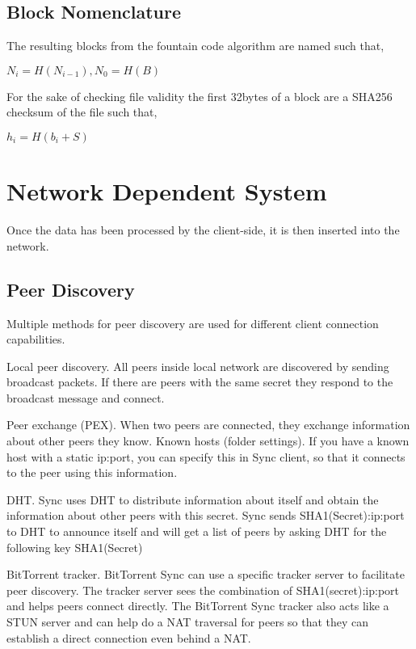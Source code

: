 \documentclass[journal]{IEEEtran}
\begin{document}
\subsection{Block Nomenclature}
The resulting blocks from the fountain code algorithm are named such that,

\begin{center}
$N_i = H(N_{i-1}), N_0 = H(B)$\\
\end{center}

For the sake of checking file validity the first 32bytes of a block are a SHA256 checksum of the file such that,

\begin{center}
$h_i = H(b_i + S)$\\
\end{center}

\section{Network Dependent System}
Once the data has been processed by the client-side, it is then inserted into the network.

\subsection{Peer Discovery}
Multiple methods for peer discovery are used for different client connection capabilities. 

Local peer discovery. All peers inside local network are discovered by sending broadcast packets. If there are peers with the same secret they respond to the broadcast message and connect.

Peer exchange (PEX). When two peers are connected, they exchange information about other peers they know.
Known hosts (folder settings). If you have a known host with a static ip:port, you can specify this in Sync client, so that it connects to the peer using this information.

DHT. Sync uses DHT to distribute information about itself and obtain the information about other peers with this secret. Sync sends SHA1(Secret):ip:port to DHT to announce itself and will get a list of peers by asking DHT for the following key SHA1(Secret)

BitTorrent tracker. BitTorrent Sync can use a specific tracker server to facilitate peer discovery. The tracker server sees the combination of SHA1(secret):ip:port and helps peers connect directly. The BitTorrent Sync tracker also acts like a STUN server and can help do a NAT traversal for peers so that they can establish a direct connection even behind a NAT.
\end{document}
